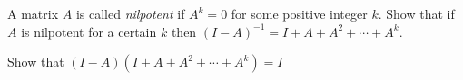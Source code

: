
\begin{Exercise}[
name={},
title={}, 
difficulty=0,
origin={\cite{AG}}]
A matrix $A$ is called \emph{nilpotent} if $A^k=0$ for some positive integer $k$. Show that if $A$ is nilpotent for a certain $k$ then $(I-A)^{-1}=I+A+A^2+\cdots+A^k$.
\end{Exercise}

\begin{Answer}
Show that $(I-A)(I+A+A^2+\cdots+A^k)=I$
\end{Answer}
